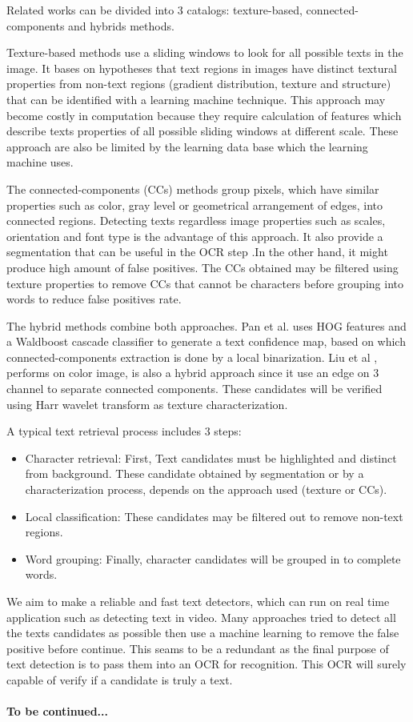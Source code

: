 Related works can be divided into 3 catalogs: texture-based, connected-components and hybrids methods. 
\par
Texture-based methods \cite{Chen.2004.CVPR} use a sliding windows to look for all possible texts in the image. It bases on hypotheses that text regions in images have distinct textural properties from non-text regions (gradient distribution, texture and structure) that can be identified with a learning machine technique. This approach may become costly in computation because they require calculation of features which describe texts properties of all possible sliding windows at different scale. These approach are also be limited by the learning data base which the learning machine uses. 
\par
The connected-components (CCs) methods \cite{Epshtein.2010.CVPR} \cite{xucheng.2013.pami} group pixels, which have similar properties such as color, gray level or geometrical arrangement of edges, into connected regions. Detecting texts regardless image properties such as scales, orientation and font type is the advantage of this approach. It also provide a segmentation that can be useful in the OCR step .In the other hand, it might produce high amount of false positives. The CCs obtained may be filtered using texture properties to remove CCs that cannot be characters before grouping into words to reduce false positives rate.
\par
The hybrid methods combine both approaches. Pan et al. \cite{Pan2009} uses HOG features and a Waldboost cascade classifier to generate a text confidence map, based on which connected-components extraction is done by a local binarization. Liu et al \cite{Liu.2006.CRA}, performs on color image, is also a hybrid approach since it use an edge on 3 channel to separate connected components. These candidates will be verified using Harr wavelet transform as texture characterization.
\par
A typical text retrieval process includes 3 steps:
\begin{itemize}\item
Character retrieval: First, Text candidates must be highlighted and distinct from background. These candidate obtained by segmentation or by a characterization process, depends on the approach used (texture or CCs).
\item
Local classification: These candidates may be filtered out to remove non-text regions.
\item
Word grouping: Finally, character candidates will be grouped in to complete words. 
\end{itemize}
\par 
We aim to make a reliable and fast text detectors, which can run on real time application such as detecting text in video. Many approaches  tried to detect all the texts candidates as possible then use a machine learning to remove the false positive before continue. This seams to be a redundant as the final purpose of text detection is to pass them into an OCR for recognition. This OCR will surely capable of verify if a candidate is truly a text.
\paragraph{To be continued...}
